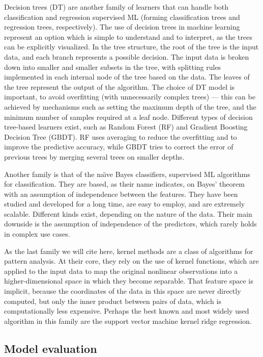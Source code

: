 \documentclass[aip,apm,amsmath,amssymb,reprint]{revtex4-2}
\begin{document}
Decision trees (DT) are another family of learners that can handle both classification and regression supervised ML (forming classification trees and regression trees, respectively). The use of decision trees in machine learning represent an option which is simple to understand and to interpret, as the trees can be explicitly visualized. In the tree structure, the root of the tree is the input data, and each branch represents a possible decision. The input data is broken down into smaller and smaller subsets in the tree, with splitting rules implemented in each internal node of the tree based on the data. The leaves of the tree represent the output of the algorithm. The choice of DT model is important, to avoid overfitting (with unnecessarily complex trees) --- this can be achieved by mechanisms such as setting the maximum depth of the tree, and the minimum number of samples required at a leaf node. Different types of decision tree-based learners exist, such as Random Forest (RF) and Gradient Boosting Decision Tree (GBDT). RF uses averaging to reduce the overfitting and to improve the predictive accuracy, while GBDT tries to correct the error of previous trees by merging several trees on smaller depths.

Another family is that of the na{\"\i}ve Bayes classifiers, supervised ML algorithms for classification. They are based, as their name indicates, on Bayes' theorem with an assumption of independence between the features. They have been studied and developed for a long time, are easy to employ, and are extremely scalable. Different kinds exist, depending on the nature of the data. Their main downside is the assumption of independence of the predictors, which rarely holds in complex use cases.

As the last family we will cite here, kernel methods are a class of algorithms for pattern analysis. At their core, they rely on the use of kernel functions, which are applied to the input data to map the original nonlinear observations into a higher-dimensional space in which they become separable. That feature space is implicit, because the coordinates of the data in this space are never directly computed, but only the inner product between pairs of data, which is computationally less expensive. Perhaps the best known and most widely used algorithm in this family are the support vector machine kernel ridge regression.


\subsection{Model evaluation}
\end{document}

